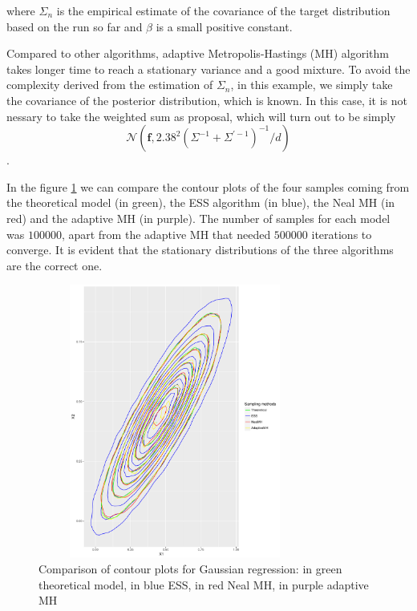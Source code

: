 \documentclass{article}
\begin{document}
where $\Sigma_n$ is the empirical estimate of the covariance of the target distribution based on the run so far and $\beta$ is a small positive constant.

Compared to other algorithms, adaptive Metropolis-Hastings (MH) algorithm takes longer time to reach a stationary variance and a good mixture. To avoid the complexity derived from the estimation of $\Sigma_n$, in this example, we simply take the covariance of the posterior distribution, which is known. In this case, it is not nessary to take the weighted sum as proposal, which will turn out to be simply $$\mathcal{N}\left(\mathbf{f},2.38^2\left(\Sigma^{-1}+\Sigma^{'-1}\right)^{-1}/d\right)$$.

In the figure \ref{comparison} we can compare the contour plots of the four samples coming from the theoretical model (in green), the ESS algorithm (in blue), the Neal MH (in red) and the adaptive MH (in purple). The number of samples for each model was $100000$, apart from the adaptive MH that needed $500000$ iterations to converge. It is evident that the stationary distributions of the three algorithms are the correct one.
\begin{figure}[H]\label{comparison}
\centering
\includegraphics[height=9cm,width = 9cm]{ComparisonGauss.pdf}
\caption{Comparison of contour plots for Gaussian regression: in green theoretical model, in blue ESS, in red Neal MH, in purple adaptive MH}
\end{figure}
\vskip 5mm
\end{document}
